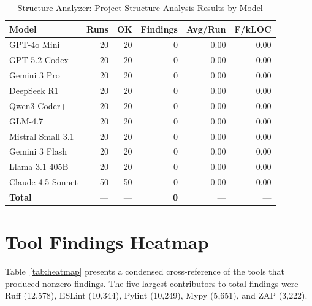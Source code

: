 \begin{table}[htbp]
    \centering
    \caption{Structure Analyzer: Project Structure Analysis Results by Model}
    \label{tab:tool_structure}
    \small
    \begin{tabular}{@{} l r r r r r @{}}
        \toprule
        \textbf{Model} & \textbf{Runs} & \textbf{OK} & \textbf{Findings} & \textbf{Avg/Run} & \textbf{F/kLOC} \\
        \midrule
        GPT-4o Mini & 20 & 20 & 0 & 0.00 & 0.00 \\
        GPT-5.2 Codex & 20 & 20 & 0 & 0.00 & 0.00 \\
        Gemini 3 Pro & 20 & 20 & 0 & 0.00 & 0.00 \\
        DeepSeek R1 & 20 & 20 & 0 & 0.00 & 0.00 \\
        Qwen3 Coder+ & 20 & 20 & 0 & 0.00 & 0.00 \\
        GLM-4.7 & 20 & 20 & 0 & 0.00 & 0.00 \\
        Mistral Small 3.1 & 20 & 20 & 0 & 0.00 & 0.00 \\
        Gemini 3 Flash & 20 & 20 & 0 & 0.00 & 0.00 \\
        Llama 3.1 405B & 20 & 20 & 0 & 0.00 & 0.00 \\
        Claude 4.5 Sonnet & 50 & 50 & 0 & 0.00 & 0.00 \\
        \midrule
        \textbf{Total} & --- & --- & \textbf{0} & --- & --- \\
        \bottomrule
    \end{tabular}
\end{table}

\section{Tool Findings Heatmap}
\label{sec:heatmap}

Table~\ref{tab:heatmap} presents a condensed cross-reference of the tools that produced nonzero findings. The five largest contributors to total findings were Ruff (12{,}578), ESLint (10{,}344), Pylint (10{,}249), Mypy (5{,}651), and ZAP (3{,}222).

